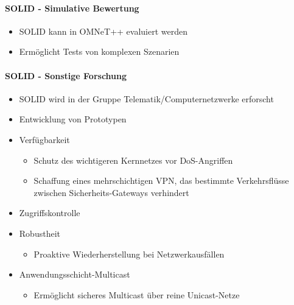 \documentclass[a4paper]{article}
\begin{document}
\begin{multicols}{3}
    \paragraph{SOLID - Simulative
        Bewertung}

    \begin{itemize}
        \item
              SOLID kann in OMNeT++ evaluiert werden
        \item
              Ermöglicht Tests von komplexen Szenarien
    \end{itemize}


    \paragraph{SOLID - Sonstige
        Forschung}

    \begin{itemize}
        \item
              SOLID wird in der Gruppe Telematik/Computernetzwerke erforscht
        \item
              Entwicklung von Prototypen
        \item
              Verfügbarkeit

              \begin{itemize}
                  \item
                        Schutz des wichtigeren Kernnetzes vor DoS-Angriffen
                  \item
                        Schaffung eines mehrschichtigen VPN, das bestimmte Verkehrsflüsse
                        zwischen Sicherheits-Gateways verhindert
              \end{itemize}
        \item
              Zugriffskontrolle
        \item
              Robustheit

              \begin{itemize}
                  \item
                        Proaktive Wiederherstellung bei Netzwerkausfällen
              \end{itemize}
        \item
              Anwendungsschicht-Multicast

              \begin{itemize}
                  \item
                        Ermöglicht sicheres Multicast über reine Unicast-Netze
              \end{itemize}
    \end{itemize}



\end{multicols}
\end{document}
